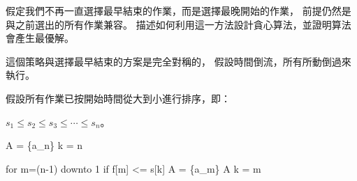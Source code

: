 \startEXERCISE
假定我們不再一直選擇最早結束的作業，而是選擇最晚開始的作業，
前提仍然是與之前選出的所有作業兼容。
描述如何利用這一方法設計貪心算法，並證明算法會產生最優解。
\stopEXERCISE

\startANSWER
這個策略與選擇最早結束的方案是完全對稱的，
假設時間倒流，所有所動倒過來執行。

假設所有作業已按開始時間從大到小進行排序，即：

$s_1\le s_2\le s_3\le\cdots\le s_n$。

\startCLRSCODE
A = \{a_n\}
k = n

for m=(n-1) downto 1
	if f[m] <= s[k]
		A = \{a_m\} \cup A
		k = m
\stopCLRSCODE

\stopANSWER
